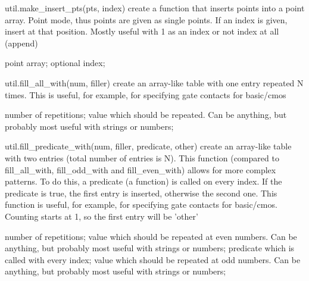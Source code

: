 \begin{APIfunc}{util.make\_insert\_pts(pts, index)}
    create a function that inserts points into a point array. Point mode, thus points are given as single points. If an index is given, insert at that position. Mostly useful with 1 as an index or not index at all (append)
    \begin{APIparameters}
            point array;
            optional index;
    \end{APIparameters}
\end{APIfunc}
\begin{APIfunc}{util.fill\_all\_with(num, filler)}
    create an array-like table with one entry repeated N times. This is useful, for example, for specifying gate contacts for basic/cmos
    \begin{APIparameters}
            number of repetitions;
            value which should be repeated. Can be anything, but probably most useful with strings or numbers;
    \end{APIparameters}
\end{APIfunc}
\begin{APIfunc}{util.fill\_predicate\_with(num, filler, predicate, other)}
    create an array-like table with two entries (total number of entries is N). This function (compared to fill\_all\_with, fill\_odd\_with and fill\_even\_with) allows for more complex patterns. To do this, a predicate (a function) is called on every index. If the predicate is true, the first entry is inserted, otherwise the second one. This function is useful, for example, for specifying gate contacts for basic/cmos. Counting starts at 1, so the first entry will be 'other'
    \begin{APIparameters}
            number of repetitions;
            value which should be repeated at even numbers. Can be anything, but probably most useful with strings or numbers;
            predicate which is called with every index;
            value which should be repeated at odd numbers. Can be anything, but probably most useful with strings or numbers;
    \end{APIparameters}
\end{APIfunc}
